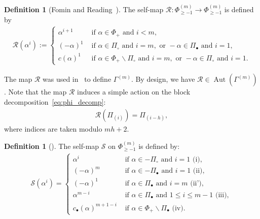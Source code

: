 \documentclass[11pt]{article}
\theoremstyle{definition}
\newtheorem{defi}[theo]{Definition}
\DeclareMathOperator{\Aut}{Aut}
\newcommand{\RR}{\mathcal{R}}
\renewcommand{\SS}{\mathcal{S}}
\begin{document}
\begin{defi}[Fomin and Reading~\cite{fominreading}]
    The self-map $\RR :\Phi^{(m)}_{\geq -1} \to \Phi^{(m)}_{\geq -1} $ is defined by
    \begin{align} \label{eq:defR}
        \RR(\alpha^i) :=
        \begin{cases}
            \alpha^{i+1} & \text{ if } \alpha\in\Phi_+ \text{ and } i<m,\\
            (-\alpha)^1 & \text{ if } \alpha \in \Pi_\circ \text{ and } i=m, \text{ or } -\alpha \in \Pi_\bullet \text{ and } i=1,\\
            c(\alpha)^1 & \text{ if } \alpha \in \Phi_+ \backslash \Pi_\circ \text{ and } i=m, \text{ or } -\alpha \in \Pi_\circ \text{ and } i=1. 
        \end{cases}
    \end{align}
\end{defi}

The map $\RR$ was used in~\cite{fominreading} to define $\Gamma^{(m)}$.  By design, we have $\RR \in \Aut(\Gamma^{(m)})$.  Note that the map $\RR$ induces a simple action on the block decomposition~\eqref{eq:phi_decomp}:
\begin{align} \label{eq:rr_delta}
    \RR( \varPi_{(i)} ) = \varPi_{(i-h)},
\end{align}
where indices are taken modulo $mh+2$.

\begin{defi}[\cite{josuatverges}]
    The self-map $\SS$ on $\Phi^{(m)}_{\geq -1}$ is defined by:
    \begin{align} \label{eq:defS}
        \SS( \alpha^i )
        =
        \begin{cases}
            \alpha^i & \text{ if } \alpha \in -\Pi_\circ \text{ and } i=1 \text{ (i)}, \\
            (-\alpha)^m & \text{ if } \alpha \in -\Pi_\bullet \text{ and } i=1 \text{ (ii)}, \\
            (-\alpha)^1 & \text{ if } \alpha\in \Pi_\bullet \text{ and } i=m \text{ (ii')},\\
            \alpha^{m-i} & \text{ if } \alpha\in \Pi_\bullet \text{ and } 1\leq i \leq m-1 \text{ (iii)},\\
            c_\bullet(\alpha)^{m+1-i} & \text{ if } \alpha \in \Phi_+ \backslash \Pi_\bullet \text{ (iv)}.
        \end{cases}
    \end{align}
\end{defi}
\end{document}
